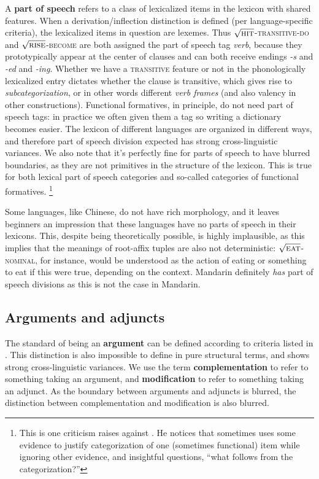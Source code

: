 \documentclass[UTF8, a4paper, oneside, scheme=plain, 12pt]{ctexrep}
\newcommand*{\concept}[1]{\textbf{#1}}
\newcommand*{\term}[1]{\emph{#1}}
\newcommand{\form}[1]{\emph{#1}}
\newcommand*{\category}[1]{\textsc{#1}}
\newcommand*{\wordroot}[1]{$\sqrt{\text{\textsc{#1}}}$}
\begin{document}
{A \concept{part of speech} refers to a class of lexicalized items in the lexicon with shared features.
When a derivation/inflection distinction is defined (per language-specific criteria),
the lexicalized items in question are lexemes.
Thus \wordroot{hit}-\category{transitive}-\category{do}
and \wordroot{rise}-\category{become}
are both assigned the part of speech tag \term{verb},
because they prototypically appear at the center of clauses
and can both receive endings \form{-s} and \form{-ed} and \form{-ing}.
Whether we have a \category{transitive} feature or not in the phonologically lexicalized entry
dictates whether the clause is transitive,
which gives rise to \term{subcategorization}, or in other words different \term{verb frames}
(and also valency in other constructions).
Functional formatives, in principle, do not need part of speech tags:
in practice we often given them a tag so writing a dictionary becomes easier.
The lexicon of different languages are organized in different ways,
and therefore part of speech division expected has strong cross-linguistic variances.
We also note that it's perfectly fine for parts of speech to have blurred boundaries,
as they are not primitives in the structure of the lexicon.
This is true for both lexical part of speech categories and
so-called categories of functional formatives.%
\footnote{
    This is one criticism \citet{culicover2004cambridge} raises against \citet{cgel}.
    He notices that \citet{cgel} sometimes uses some evidence to 
    justify categorization of one (sometimes functional) item while ignoring other evidence,
    and insightful questions, ``what follows from the categorization?''
}

Some languages, like Chinese, do not have rich morphology,
and it leaves beginners an impression that these languages have no parts of speech in their lexicons.
This, despite being theoretically possible, is highly implausible,
as this implies that the meanings of root-affix tuples are also not deterministic:
\wordroot{eat}-\category{nominal}, for instance,
would be understood as the action of eating or something to eat if this were true,
depending on the context.
Mandarin definitely \emph{has} part of speech divisions
as this is not the case in Mandarin.

\subsection{Arguments and adjuncts}

The standard of being an \concept{argument} can be defined according to 
criteria listed in .
This distinction is also impossible to define in pure structural terms,
and shows strong cross-linguistic variances.
We use the term \concept{complementation} to refer to something taking an argument,
and \concept{modification} to refer to something taking an adjunct.
As the boundary between arguments and adjuncts is blurred,
the distinction between complementation and modification is also blurred.

}
\end{document}
